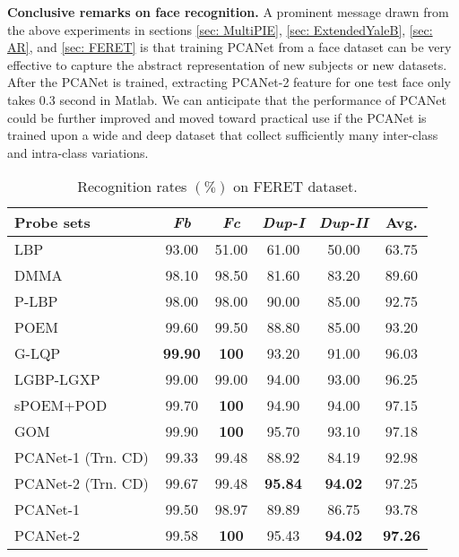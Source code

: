 \documentclass[10pt,journal,compsoc]{IEEEtran}
\begin{document}
{\bf Conclusive remarks on face recognition.} A prominent message drawn from the above experiments in sections \ref{sec: MultiPIE}, \ref{sec: ExtendedYaleB}, \ref{sec: AR}, and \ref{sec: FERET} is that training PCANet from a face dataset can be very effective to capture the abstract representation of new subjects or new datasets. After the PCANet is trained, extracting PCANet-2 feature for one test face only takes 0.3 second in Matlab. We can anticipate that the performance of PCANet could be further improved and moved toward practical use if the PCANet is trained upon a wide and deep dataset that collect sufficiently many inter-class and intra-class variations.


\begin{table}\centering
\caption{Recognition rates $(\%)$ on FERET dataset.}
\begin{tabular}{l|c|c|c|c||c}
  \hline
Probe sets & {\it Fb} & {\it Fc}  & {\it Dup-I}  &  {\it Dup-II} & {\rm Avg.} \\ \hline \hline
  LBP \cite{Ahonen2006} & 93.00 & 51.00 & 61.00 & 50.00 & 63.75\\
  DMMA \cite{Lu2013}  & 98.10 & 98.50 & 81.60 & 83.20 & 89.60 \\
  P-LBP \cite{Tan2010}    & 98.00 & 98.00 & 90.00 & 85.00 & 92.75 \\
  POEM \cite{Vu2012}    & 99.60 & 99.50 & 88.80 & 85.00 & 93.20 \\
  G-LQP \cite{Hussain2012} & {\bf 99.90} & {\bf  100} & 93.20 & 91.00 & 96.03 \\
  LGBP-LGXP \cite{Xie2010} & 99.00 & 99.00 & 94.00 & 93.00 & 96.25 \\
  sPOEM+POD \cite{Vu2013}   &99.70  & {\bf 100} & 94.90   & 94.00 & 97.15  \\
  GOM \cite{Chai2014} & 99.90 & {\bf 100} &  95.70  & 93.10 & 97.18 \\ \hline
  PCANet-1 (Trn. CD) & 99.33  &  99.48  &  88.92  &  84.19 & 92.98 \\
  PCANet-2 (Trn. CD) &  99.67  &  99.48  & {\bf  95.84}  &  {\bf 94.02} & 97.25 \\
PCANet-1   & 99.50  &  98.97 &   89.89  &  86.75 &  93.78 \\
  PCANet-2   & 99.58 & {\bf 100}    &  95.43 & {\bf  94.02} & {\bf 97.26}  \\
  \hline
\end{tabular}\label{tab: FERET_dataset}
\end{table}
\end{document}
